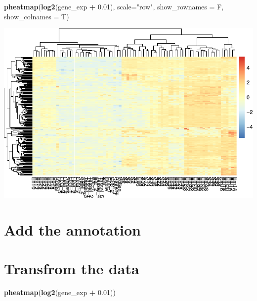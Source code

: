 \documentclass[]{book}
\makeatletter
\newenvironment{Shaded}{\begin{snugshade}}{\end{snugshade}}
\newcommand{\DataTypeTok}[1]{\textcolor[rgb]{0.13,0.29,0.53}{#1}}
\newcommand{\FloatTok}[1]{\textcolor[rgb]{0.00,0.00,0.81}{#1}}
\newcommand{\KeywordTok}[1]{\textcolor[rgb]{0.13,0.29,0.53}{\textbf{#1}}}
\newcommand{\NormalTok}[1]{#1}
\newcommand{\OperatorTok}[1]{\textcolor[rgb]{0.81,0.36,0.00}{\textbf{#1}}}
\newcommand{\StringTok}[1]{\textcolor[rgb]{0.31,0.60,0.02}{#1}}
\newenvironment{kframe}{%
\medskip{}
\setlength{\fboxsep}{.8em}
 \def\at@end@of@kframe{}%
 \ifinner\ifhmode%
  \def\at@end@of@kframe{\end{minipage}}%
  \begin{minipage}{\columnwidth}%
 \fi\fi%
 \def\FrameCommand##1{\hskip\@totalleftmargin \hskip-\fboxsep
 \colorbox{shadecolor}{##1}\hskip-\fboxsep
     \hskip-\linewidth \hskip-\@totalleftmargin \hskip\columnwidth}%
 \MakeFramed {\advance\hsize-\width
   \@totalleftmargin\z@ \linewidth\hsize
   \@setminipage}}%
 {\par\unskip\endMakeFramed%
 \at@end@of@kframe}
\renewenvironment{Shaded}{\begin{kframe}}{\end{kframe}}
\makeatother
\begin{document}
\begin{Shaded}
\begin{Highlighting}[]
\KeywordTok{pheatmap}\NormalTok{(}\KeywordTok{log2}\NormalTok{(gene_exp }\OperatorTok{+}\StringTok{ }\FloatTok{0.01}\NormalTok{), }\DataTypeTok{scale=}\StringTok{"row"}\NormalTok{, }\DataTypeTok{show_rownames =}\NormalTok{ F, }\DataTypeTok{show_colnames =}\NormalTok{ T)}
\end{Highlighting}
\end{Shaded}

\includegraphics{bioinfBookXIE186_files/figure-latex/unnamed-chunk-95-4.pdf}

\hypertarget{add-the-annotation}{%
\section{Add the annotation}\label{add-the-annotation}}

\hypertarget{section}{%
\section{}\label{section}}

\hypertarget{transfrom-the-data}{%
\section{Transfrom the data}\label{transfrom-the-data}}

\begin{Shaded}
\begin{Highlighting}[]
\KeywordTok{pheatmap}\NormalTok{(}\KeywordTok{log2}\NormalTok{(gene_exp }\OperatorTok{+}\StringTok{ }\FloatTok{0.01}\NormalTok{)) }
\end{Highlighting}
\end{Shaded}
\end{document}
